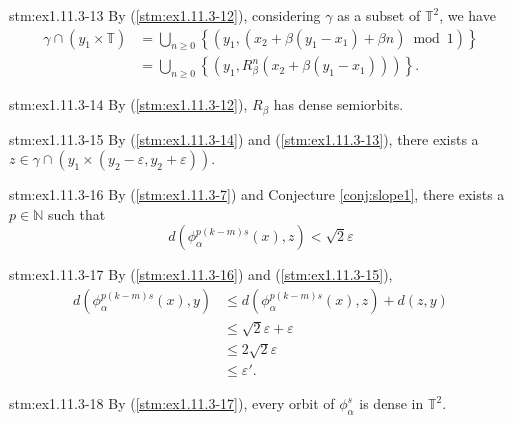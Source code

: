 \begin{statement}{stm:ex1.11.3-13}
By (\ref{stm:ex1.11.3-12}), considering $\gamma$ as a subset of $\mathbb{T}^2$, we have
\begin{align*}
\gamma \cap (y_1 \times \mathbb{T})
&= \bigcup_{n \ge 0} \left\{ \left( y_1, (x_2 + \beta(y_1 - x_1) + \beta n) \bmod 1 \right) \right\} \\
&= \bigcup_{n \ge 0} \left\{ \left( y_1, R_\beta^n(x_2 + \beta(y_1 - x_1)) \right) \right\}.
\end{align*}
\end{statement}


\begin{statement}{stm:ex1.11.3-14}
By (\ref{stm:ex1.11.3-12}), $R_\beta$ has dense semiorbits.
\end{statement}

\begin{statement}{stm:ex1.11.3-15}
By (\ref{stm:ex1.11.3-14}) and (\ref{stm:ex1.11.3-13}), there exists a $z \in \gamma \cap (y_1 \times (y_2 - \varepsilon, y_2 + \varepsilon))$.
\end{statement}

\begin{statement}{stm:ex1.11.3-16}
By (\ref{stm:ex1.11.3-7}) and Conjecture \ref{conj:slope1}, there exists a $p \in \mathbb{N}$ such that $$d(\phi_\alpha^{p(k-m)s}(x), z) < \sqrt{2} \varepsilon$$
\end{statement}

\begin{statement}{stm:ex1.11.3-17}
By (\ref{stm:ex1.11.3-16}) and (\ref{stm:ex1.11.3-15}),
\begin{align*}
d(\phi_\alpha^{p(k-m)s}(x), y)
&\le d(\phi_\alpha^{p(k-m)s}(x), z) + d(z, y) \\
&\le \sqrt{2} \varepsilon + \varepsilon \\
&\le 2\sqrt{2} \varepsilon \\
&\le \varepsilon'.
\end{align*}
\end{statement}


\begin{statement}{stm:ex1.11.3-18}
By (\ref{stm:ex1.11.3-17}), every orbit of $\phi_\alpha^s$ is dense in $\mathbb{T}^2$.
\end{statement}

